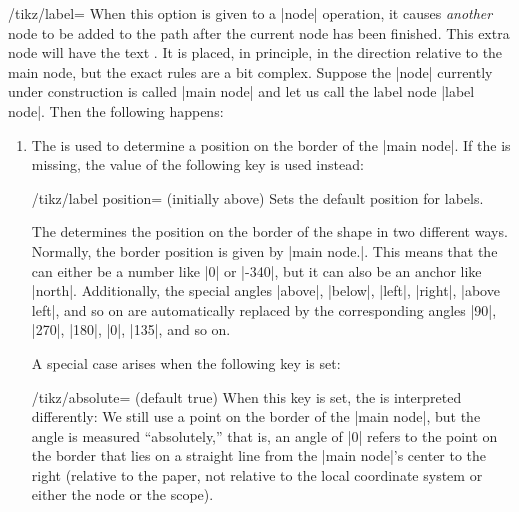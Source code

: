 \begin{key}{/tikz/label=}
  \label{label-option}%
  When this option is given to a |node| operation, it causes
  \emph{another} node to be added to the path after the current node
  has been finished. This extra node will have the text
  . It is placed, in principle, in the direction
   relative to the main node, but the exact rules are a
  bit complex. Suppose the |node| currently under construction is called
  |main node| and let us call the label node |label node|. Then the
  following happens:
  \begin{enumerate}
  \item The  is used to determine a position on the border
    of the |main node|. If the  is missing, the value of
    the following key is used instead:
    \begin{key}{/tikz/label position= (initially above)}
      Sets the default position for labels.
    \end{key}
    The  determines the position on the border of the
    shape in two different ways. Normally, the border position is
    given by |main node.|. This means that the
     can either be a number like |0| or |-340|, but it can
    also be an anchor like |north|. Additionally, the special angles
    |above|, |below|, |left|, |right|, |above left|, and so on are
    automatically replaced by the corresponding angles |90|, |270|,
    |180|, |0|, |135|, and so on.

    A special case arises when the following key is set:
    \begin{key}{/tikz/absolute= (default true)}
      When this key is set, the  is interpreted
      differently: We still use a point on the border of the
      |main node|, but the angle is measured ``absolutely,'' that is,
      an angle of |0| refers to the point on the border that lies on a
      straight line from the |main node|'s center to the right
      (relative to the paper, not relative to the local coordinate
      system or either the node or the scope).


\end{key}
\end{enumerate}
\end{key}

